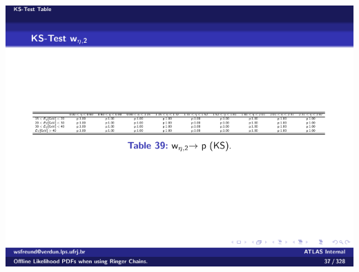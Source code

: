 \begin{table}[b]
\begin{subtable}{\textwidth}
\caption{\weta{}\label{tab:gof_ks_p_values_weta}}
\includegraphics[width=\textwidth]{appendices/figures/gof/weta2_ks_table.pdf}
\end{subtable} \\
\end{table}%
